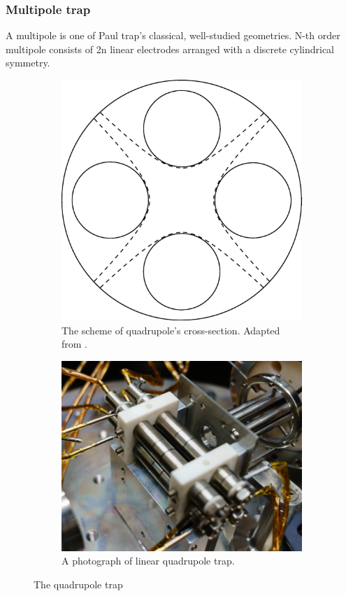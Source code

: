 \subsubsection{Multipole trap}
A multipole is one of Paul trap's classical, well-studied geometries. N-th order multipole consists of 2n linear electrodes arranged with a discrete cylindrical symmetry.
\begin{figure}[H]
\begin{subfigure}{.4\textwidth}
	\centering
	\includegraphics[width=\linewidth]{img/quadrupole_scheme.png}
	\caption{The scheme of quadrupole's cross-section. Adapted from \cite{FANGHANEL2017124}.}
	\label{fig:quadrupole scheme}
\end{subfigure}\hfill%
\begin{subfigure}{.47\textwidth}
	\centering
	\includegraphics[width=\linewidth]{img/quadrupole.png}
	\caption{A photograph of linear quadrupole trap.}
	\label{fig:quadrupole picture}
\end{subfigure}
\caption{The quadrupole trap}
\label{fig:quadrupole}
\end{figure}
